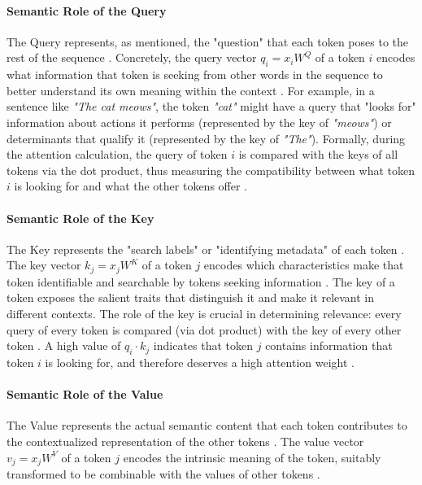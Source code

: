 \paragraph{Semantic Role of the Query} The Query represents, as mentioned, the "question" that each token poses to the rest of the sequence \cite{arxiv-attention, stanford}. Concretely, the query vector $q_i=x_iW^Q$ of a token $i$ encodes what information that token is seeking from other words in the sequence to better understand its own meaning within the context \cite{hashnode, GeeksForGeeks}. For example, in a sentence like \textit{"The cat meows"}, the token \textit{"cat"} might have a query that "looks for" information about actions it performs (represented by the key of \textit{"meows"}) or determinants that qualify it (represented by the key of \textit{"The"}).
Formally, during the attention calculation, the query of token $i$ is compared with the keys of all tokens via the dot product, thus measuring the compatibility between what token $i$ is looking for and what the other tokens offer \cite{arxiv-attention, git-hub}.

\paragraph{Semantic Role of the Key} The Key represents the "search labels" or "identifying metadata" of each token \cite{hashnode, GeeksForGeeks}. The key vector $k_j=x_jW^K$ of a token $j$ encodes which characteristics make that token identifiable and searchable by tokens seeking information \cite{arxiv-attention}. The key of a token exposes the salient traits that distinguish it and make it relevant in different contexts. The role of the key is crucial in determining relevance: every query of every token is compared (via dot product) with the key of every other token \cite{arxiv-attention, stanford}. A high value of $q_i \cdot k_j$ indicates that token $j$ contains information that token $i$ is looking for, and therefore deserves a high attention weight \cite{git-hub}.

\paragraph{Semantic Role of the Value} The Value represents the actual semantic content that each token contributes to the contextualized representation of the other tokens \cite{arxiv-attention, stanford}. The value vector $v_j=x_jW^V$ of a token $j$ encodes the intrinsic meaning of the token, suitably transformed to be combinable with the values of other tokens \cite{hashnode, GeeksForGeeks}.

